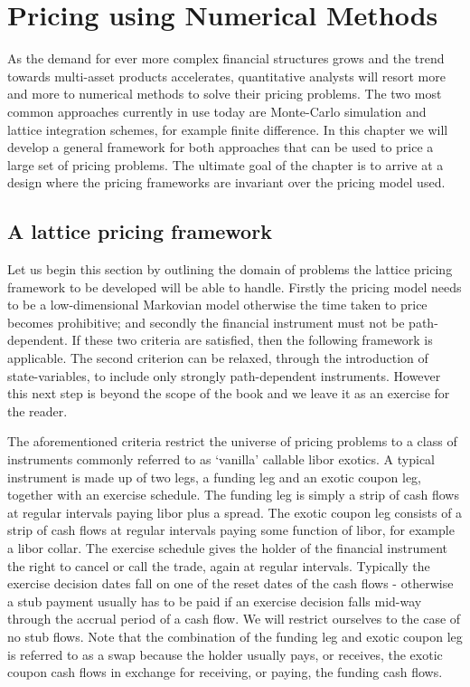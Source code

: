\chapter{Pricing using Numerical Methods}
\label{ch:pricing-using-numerical-methods}

As the demand for ever more complex financial structures grows and the
trend towards multi-asset products accelerates, quantitative analysts
will resort more and more to numerical methods to solve their pricing
problems.  The two most common approaches currently in use today are
Monte-Carlo simulation and lattice integration schemes, for example
finite difference. In this chapter we will develop a general framework
for both approaches that can be used to price a large set of pricing
problems. The ultimate goal of the chapter is to arrive at a design
where the pricing frameworks are invariant over the pricing model
used.

\section{A lattice pricing framework} \label{DomainSpaceIntegration}
Let us begin this section by outlining the domain of problems the
lattice pricing framework to be developed will be able to
handle. Firstly the pricing model needs to be a low-dimensional
Markovian model otherwise the time taken to price becomes
prohibitive; and secondly the financial instrument must not be
path-dependent. If these two criteria are satisfied, then the
following framework is applicable. The second criterion can be
relaxed, through the introduction of state-variables, to include only
strongly path-dependent instruments. However this next step is beyond
the scope of the book and we leave it as an exercise for the reader.

The aforementioned criteria restrict the universe of pricing problems
to a class of instruments commonly referred to as `vanilla' callable
libor exotics. A typical instrument is made up of two legs, a funding
leg and an exotic coupon leg, together with an exercise schedule. The
funding leg is simply a strip of cash flows at regular intervals
paying libor plus a spread. The exotic coupon leg consists of a strip
of cash flows at regular intervals paying some function of libor, for
example a libor collar. The exercise schedule gives the holder of the
financial instrument the right to cancel or call the trade, again at
regular intervals. Typically the exercise decision dates fall on one
of the reset dates of the cash flows - otherwise a stub payment usually
has to be paid if an exercise decision falls mid-way through the
accrual period of a cash flow. We will restrict ourselves to the case
of no stub flows. Note that the combination of the funding leg and
exotic coupon leg is referred to as a swap because the holder usually
pays, or receives, the exotic coupon cash flows in exchange for receiving,  
or paying, the funding cash flows.

